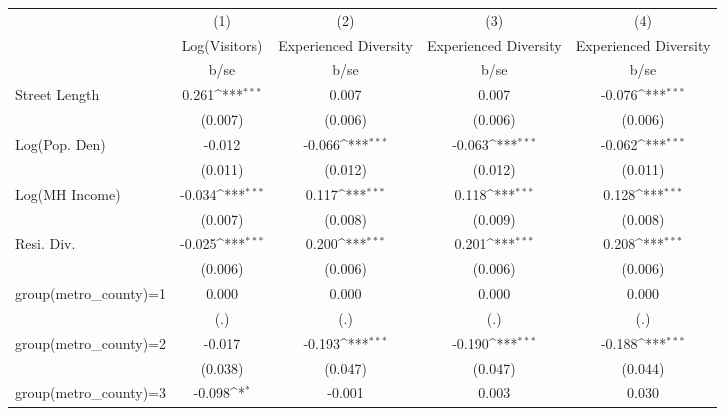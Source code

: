 {
\def\sym#1{\ifmmode^{#1}\else\(^{#1}\)\fi}
\begin{tabular}{l*{4}{c}}
\toprule
                    &\multicolumn{1}{c}{(1)}&\multicolumn{1}{c}{(2)}&\multicolumn{1}{c}{(3)}&\multicolumn{1}{c}{(4)}\\
                    &\multicolumn{1}{c}{Log(Visitors)}&\multicolumn{1}{c}{Experienced Diversity}&\multicolumn{1}{c}{Experienced Diversity}&\multicolumn{1}{c}{Experienced Diversity}\\
                    &        b/se         &        b/se         &        b/se         &        b/se         \\
\midrule
Street Length       &       0.261\sym{***}&       0.007         &       0.007         &      -0.076\sym{***}\\
                    &     (0.007)         &     (0.006)         &     (0.006)         &     (0.006)         \\
Log(Pop. Den)       &      -0.012         &      -0.066\sym{***}&      -0.063\sym{***}&      -0.062\sym{***}\\
                    &     (0.011)         &     (0.012)         &     (0.012)         &     (0.011)         \\
Log(MH Income)      &      -0.034\sym{***}&       0.117\sym{***}&       0.118\sym{***}&       0.128\sym{***}\\
                    &     (0.007)         &     (0.008)         &     (0.009)         &     (0.008)         \\
Resi. Div.          &      -0.025\sym{***}&       0.200\sym{***}&       0.201\sym{***}&       0.208\sym{***}\\
                    &     (0.006)         &     (0.006)         &     (0.006)         &     (0.006)         \\
group(metro\_county)=1&       0.000         &       0.000         &       0.000         &       0.000         \\
                    &         (.)         &         (.)         &         (.)         &         (.)         \\
group(metro\_county)=2&      -0.017         &      -0.193\sym{***}&      -0.190\sym{***}&      -0.188\sym{***}\\
                    &     (0.038)         &     (0.047)         &     (0.047)         &     (0.044)         \\
group(metro\_county)=3&      -0.098\sym{*}  &      -0.001         &       0.003         &       0.030         \\

\end{tabular}}
